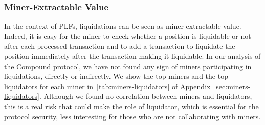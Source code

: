 \subsubsection{Miner-Extractable Value}
In the context of PLFs, liquidations can be seen as miner-extractable value.
Indeed, it is easy for the miner to check whether a position is liquidable or not after each processed transaction and to add a transaction to liquidate the position immediately after the transaction making it liquidable.
In our analysis of the Compound protocol, we have not found any sign of miners participating in liquidations, directly or indirectly.
We show the top miners and the top liquidators for each miner in~\autoref{tab:miners-liquidators} of Appendix~\ref{sec:miners-liquidators}.
Although we found no correlation between miners and liquidators, this is a real risk that could make the role of liquidator, which is essential for the protocol security, less interesting for those who are not collaborating with miners.
